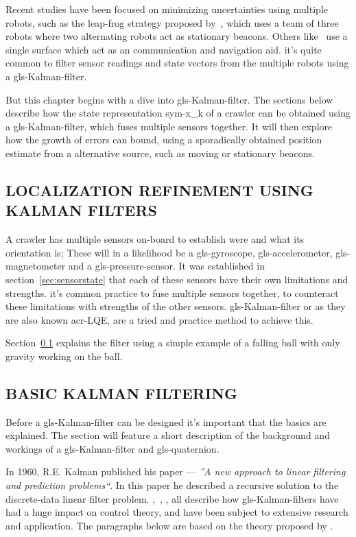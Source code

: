 Recent studies have been focused on minimizing uncertainties using multiple robots, such as the leap-frog strategy
proposed by~\citet{tully_leap_frog_2010}, which uses a team of three robots where two alternating robots act as
stationary beacons. Others like~\citet{wei_gao_robust_2014} use a single surface which act as an communication and
navigation aid. it's quite common to filter sensor readings and state vectors from the multiple robots using a
\gls{gls-Kalman-filter}.

But this chapter begins with a dive into \gls{gls-Kalman-filter}. The sections below describe how the state
representation \gls{sym-x_k} of a crawler can be obtained using a \gls{gls-Kalman-filter}, which fuses multiple sensors
together. It will then explore how the growth of errors can bound, using a sporadically obtained position estimate from
a alternative source, such as moving or stationary beacons.

\subsection{LOCALIZATION REFINEMENT USING KALMAN FILTERS}\label{sec:KalmanRefinement}

A crawler has multiple sensors on-board to establish were and what its orientation is; These will in a likelihood be a
\gls{gls-gyroscope}, \gls{gls-accelerometer}, \gls{gls-magnetometer} and a \gls{gls-pressure-sensor}. It was established
in section~\ref{sec:sensorstate} that each of these sensors have their own limitations and strengths. it's common
practice to fuse multiple sensors together, to counteract these limitations with strengths of the other sensors.
\gls{gls-Kalman-filter} or as they are also known \gls{acr-LQE}, are a tried and practice method to achieve this.

Section~\ref{sec:KalmanRefinement} explains the filter using a simple example of a falling ball with only gravity
working on the ball.

\subsection{BASIC KALMAN FILTERING}\label{sec:basic Kalman filter}

Before a \gls{gls-Kalman-filter}  can be designed it's important that the basics are explained. The section will
feature a short description of the background and workings of a \gls{gls-Kalman-filter}  and
\gls{gls-quaternion}.

In 1960, R.E. Kalman published his paper \citet{kalman_new_1960} --- \textit{''A new approach to linear filtering and
prediction problems``}. In this paper he described a recursive solution to the discrete-data linear filter problem.
\citet{welch_introduction_2006},~\citet{dandrea_novel_control_2013}, \citet{chui_kalman_1999},
\citet{grewal_kalman_2015} all describe how \gls{gls-Kalman-filter}s have had a huge impact on control theory, and have
been subject to extensive research and application. The paragraphs below are based on the theory proposed by
\citet{kalman_new_1960}.

